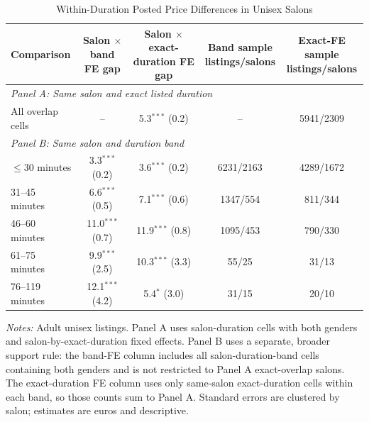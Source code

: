 \begin{table}[htbp]
  \centering
  \caption{Within-Duration Posted Price Differences in Unisex Salons}
  \label{tab:within_duration_gaps}
  \footnotesize
\begin{tabular}{lcccc}
\hline
Comparison & \makecell{Salon $\times$ band\\FE gap} & \makecell{Salon $\times$ exact-\\duration FE gap} & \makecell{Band sample\\listings/salons} & \makecell{Exact-FE sample\\listings/salons} \\
\hline
\multicolumn{5}{l}{\textit{Panel A: Same salon and exact listed duration}} \\
All overlap cells & -- & 5.3$^{***}$ (0.2) & -- & 5941/2309 \\
\hline
\multicolumn{5}{l}{\textit{Panel B: Same salon and duration band}} \\
$\leq$30 minutes & 3.3$^{***}$ (0.2) & 3.6$^{***}$ (0.2) & 6231/2163 & 4289/1672 \\
31--45 minutes & 6.6$^{***}$ (0.5) & 7.1$^{***}$ (0.6) & 1347/554 & 811/344 \\
46--60 minutes & 11.0$^{***}$ (0.7) & 11.9$^{***}$ (0.8) & 1095/453 & 790/330 \\
61--75 minutes & 9.9$^{***}$ (2.5) & 10.3$^{***}$ (3.3) & 55/25 & 31/13 \\
76--119 minutes & 12.1$^{***}$ (4.2) & 5.4$^{*}$ (3.0) & 31/15 & 20/10 \\
\hline
\end{tabular}

\begin{minipage}{0.94\linewidth}
\footnotesize
\textit{Notes:} Adult unisex listings.
Panel A uses salon-duration cells with both genders and salon-by-exact-duration fixed effects.
Panel B uses a separate, broader support rule: the band-FE column includes all salon-duration-band cells containing both genders and is not restricted to Panel A exact-overlap salons.
The exact-duration FE column uses only same-salon exact-duration cells within each band, so those counts sum to Panel A.
Standard errors are clustered by salon; estimates are euros and descriptive.
\end{minipage}
\end{table}
